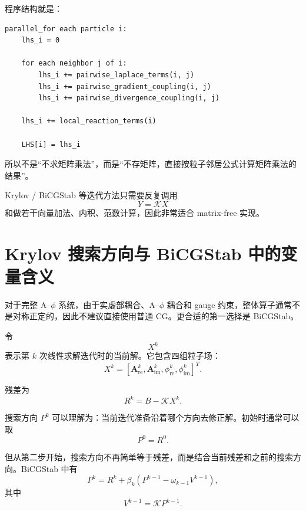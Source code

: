 \documentclass[UTF8,11pt]{ctexart}
\begin{document}
程序结构就是：
\begin{lstlisting}
parallel_for each particle i:
    lhs_i = 0

    for each neighbor j of i:
        lhs_i += pairwise_laplace_terms(i, j)
        lhs_i += pairwise_gradient_coupling(i, j)
        lhs_i += pairwise_divergence_coupling(i, j)

    lhs_i += local_reaction_terms(i)

    LHS[i] = lhs_i
\end{lstlisting}

所以不是“不求矩阵乘法”，而是“不存矩阵，直接按粒子邻居公式计算矩阵乘法的结果”。

Krylov / BiCGStab 等迭代方法只需要反复调用
\begin{equation}
    Y = \mathcal{K}X
\end{equation}
和做若干向量加法、内积、范数计算，因此非常适合 matrix-free 实现。

\section{Krylov 搜索方向与 BiCGStab 中的变量含义}

对于完整 A--$\phi$ 系统，由于实虚部耦合、A--$\phi$ 耦合和 gauge 约束，整体算子通常不是对称正定的，因此不建议直接使用普通 CG。更合适的第一选择是 BiCGStab。

令
\begin{equation}
    X^k
\end{equation}
表示第 $k$ 次线性求解迭代时的当前解。它包含四组粒子场：
\begin{equation}
    X^k =
    \left[
    \bm A_{\mathrm{re}}^k,
    \bm A_{\mathrm{im}}^k,
    \phi_{\mathrm{re}}^k,
    \phi_{\mathrm{im}}^k
    \right]^T .
\end{equation}

残差为
\begin{equation}
    R^k = B - \mathcal{K}X^k .
\end{equation}

搜索方向 $P^k$ 可以理解为：当前迭代准备沿着哪个方向去修正解。初始时通常可以取
\begin{equation}
    P^0 = R^0 .
\end{equation}

但从第二步开始，搜索方向不再简单等于残差，而是结合当前残差和之前的搜索方向。BiCGStab 中有
\begin{equation}
    P^k
    =
    R^k
    +
    \beta_k
    \left(
        P^{k-1}
        -
        \omega_{k-1}V^{k-1}
    \right),
\end{equation}
其中
\begin{equation}
    V^{k-1}
    =
    \mathcal{K}P^{k-1}.
\end{equation}
\end{document}
